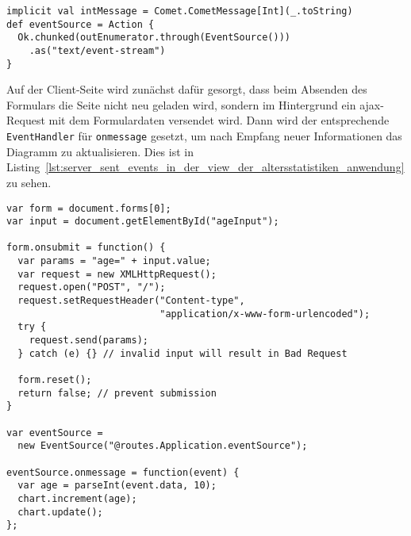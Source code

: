\begin{lstlisting}[caption=Server Sent Events im Controller der Altersstatistiken-Anwendung, label=lst:server_sent_events_im_controller_der_altersstatistiken_anwendung]
implicit val intMessage = Comet.CometMessage[Int](_.toString)
def eventSource = Action {
  Ok.chunked(outEnumerator.through(EventSource()))
    .as("text/event-stream")
}
\end{lstlisting}

Auf der Client-Seite wird zunächst dafür gesorgt, dass beim Absenden des Formulars die Seite nicht neu geladen wird, sondern im Hintergrund ein \gls{ajax}-Request mit dem Formulardaten versendet wird.
Dann wird der entsprechende \lstinline|EventHandler| für \lstinline|onmessage| gesetzt, um nach Empfang neuer Informationen das Diagramm zu aktualisieren.
Dies ist in Listing~\ref{lst:server_sent_events_in_der_view_der_altersstatistiken_anwendung} zu sehen.

\begin{lstlisting}[caption=Server Sent Events in der View der Altersstatistiken-Anwendung, label=lst:server_sent_events_in_der_view_der_altersstatistiken_anwendung]
var form = document.forms[0];
var input = document.getElementById("ageInput");

form.onsubmit = function() {
  var params = "age=" + input.value;
  var request = new XMLHttpRequest();
  request.open("POST", "/");
  request.setRequestHeader("Content-type",
                           "application/x-www-form-urlencoded");
  try {
    request.send(params);
  } catch (e) {} // invalid input will result in Bad Request

  form.reset();
  return false; // prevent submission
}

var eventSource =
  new EventSource("@routes.Application.eventSource");

eventSource.onmessage = function(event) {
  var age = parseInt(event.data, 10);
  chart.increment(age);
  chart.update();
};
\end{lstlisting}



